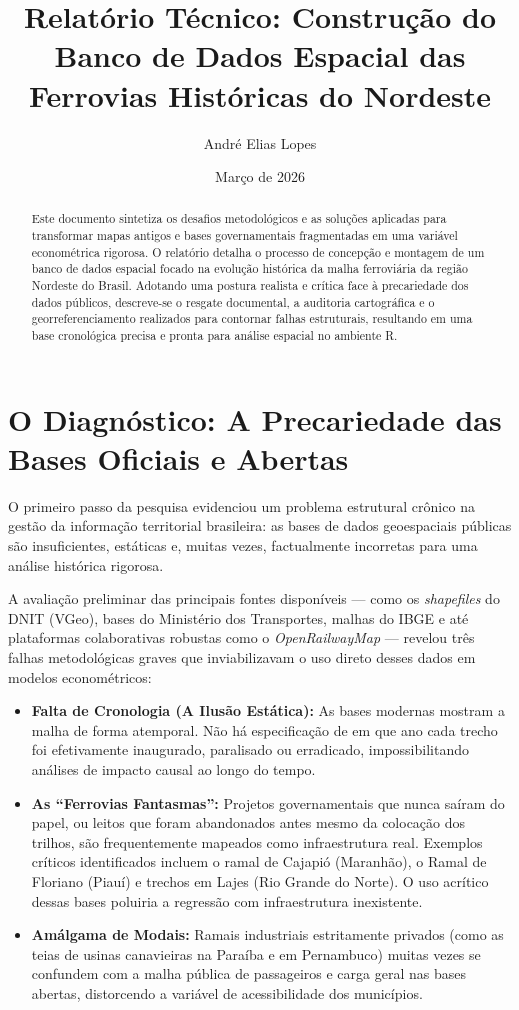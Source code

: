 \documentclass[11pt, a4paper]{article}
\title{\textbf{Relatório Técnico: Construção do Banco de Dados Espacial das Ferrovias Históricas do Nordeste}}
\author{André Elias Lopes}
\date{Março de 2026}
\begin{document}
\maketitle

\begin{abstract}
\noindent Este documento sintetiza os desafios metodológicos e as soluções aplicadas para transformar mapas antigos e bases governamentais fragmentadas em uma variável econométrica rigorosa. O relatório detalha o processo de concepção e montagem de um banco de dados espacial focado na evolução histórica da malha ferroviária da região Nordeste do Brasil. Adotando uma postura realista e crítica face à precariedade dos dados públicos, descreve-se o resgate documental, a auditoria cartográfica e o georreferenciamento realizados para contornar falhas estruturais, resultando em uma base cronológica precisa e pronta para análise espacial no ambiente R.
\end{abstract}

\vspace{0.5cm}

\section{O Diagnóstico: A Precariedade das Bases Oficiais e Abertas}

O primeiro passo da pesquisa evidenciou um problema estrutural crônico na gestão da informação territorial brasileira: as bases de dados geoespaciais públicas são insuficientes, estáticas e, muitas vezes, factualmente incorretas para uma análise histórica rigorosa. 

A avaliação preliminar das principais fontes disponíveis --- como os \textit{shapefiles} do DNIT (VGeo), bases do Ministério dos Transportes, malhas do IBGE e até plataformas colaborativas robustas como o \textit{OpenRailwayMap} --- revelou três falhas metodológicas graves que inviabilizavam o uso direto desses dados em modelos econométricos:

\begin{itemize}
    \item \textbf{Falta de Cronologia (A Ilusão Estática):} As bases modernas mostram a malha de forma atemporal. Não há especificação de em que ano cada trecho foi efetivamente inaugurado, paralisado ou erradicado, impossibilitando análises de impacto causal ao longo do tempo.
    \item \textbf{As ``Ferrovias Fantasmas'':} Projetos governamentais que nunca saíram do papel, ou leitos que foram abandonados antes mesmo da colocação dos trilhos, são frequentemente mapeados como infraestrutura real. Exemplos críticos identificados incluem o ramal de Cajapió (Maranhão), o Ramal de Floriano (Piauí) e trechos em Lajes (Rio Grande do Norte). O uso acrítico dessas bases poluiria a regressão com infraestrutura inexistente.
    \item \textbf{Amálgama de Modais:} Ramais industriais estritamente privados (como as teias de usinas canavieiras na Paraíba e em Pernambuco) muitas vezes se confundem com a malha pública de passageiros e carga geral nas bases abertas, distorcendo a variável de acessibilidade dos municípios.
\end{itemize}
\end{document}

